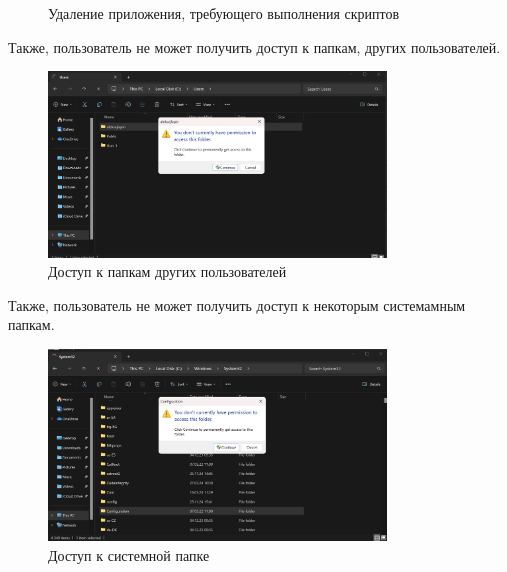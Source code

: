 \documentclass[a4paper, 14pt]{report}
\begin{document}
\begin{enumerate}
{\begin{figure}[H]
              \caption{Удаление приложения, требующего выполнения скриптов}
          \end{figure}
          Также, пользователь не может получить доступ к папкам, других пользователей.
          \begin{figure}[H]
              \centering
              \includegraphics[width=0.8\textwidth]{../images/others_folder.png}
              \caption{Доступ к папкам других пользователей}
          \end{figure}
          Также, пользователь не может получить доступ к некоторым системамным папкам.
          \begin{figure}[H]
              \centering
              \includegraphics[width=0.8\textwidth]{../images/system_folder.png}
              \caption{Доступ к системной папке}
          \end{figure}
          }
\end{enumerate}
\end{document}
